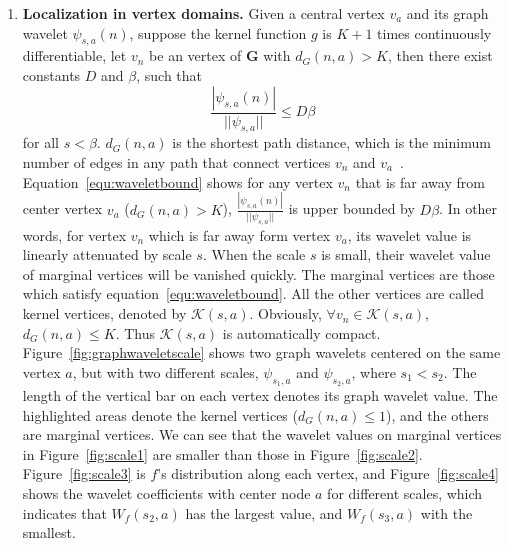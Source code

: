 \begin{enumerate}
\item \textbf{Localization in vertex domains.} Given a central vertex $v_a$ and its graph wavelet $\psi_{s,a}(n)$, suppose the kernel function $g$ is $K+1$ times continuously differentiable, let $v_n$ be an vertex of $\mathbf{G}$ with $d_G(n,a)>K$, then there exist constants $D$ and $\beta$, such that
\begin{equation}
\label{equ:waveletbound}
\frac{|\psi_{s,a}(n)|}{||\psi_{s,a}||}\leq D \beta
\end{equation} for all $s<\beta$.
$d_G(n,a)$ is the shortest path distance, which is the minimum number of edges in any path that connect vertices $v_n$ and $v_a$~\cite{hammond2011wavelets}. Equation~\ref{equ:waveletbound} shows for any vertex $v_n$ that is far away from center vertex $v_a$ ($d_G(n,a)>K$), $\frac{|\psi_{s,a}(n)|}{||\psi_{s,a}||}$ is upper bounded by $D\beta$. In other words, for vertex $v_n$ which is far away form vertex $v_a$, its wavelet value is linearly attenuated by scale $s$.  When the scale $s$ is small, their wavelet value of marginal vertices will be vanished quickly. The marginal vertices are those which satisfy equation~\ref{equ:waveletbound}. All the other vertices are called kernel vertices, denoted by $\mathcal{K}(s,a)$. Obviously, $\forall v_n \in \mathcal{K}(s,a)$,  $d_G(n,a)\le K$. Thus $\mathcal{K}(s,a)$ is automatically compact.
Figure~\ref{fig:graphwaveletscale} shows two graph wavelets centered on the same vertex $a$, but with two different scales, $\psi_{s_1,a}$ and $\psi_{s_2, a}$, where $s_1<s_2$. The length of the vertical bar on each vertex denotes its graph wavelet value. The highlighted areas denote the kernel vertices ($d_G(n,a)\le 1$), and the others are marginal vertices. We can see that the wavelet values on marginal vertices in Figure~\ref{fig:scale1} are smaller than those in Figure~\ref{fig:scale2}. Figure~\ref{fig:scale3} is $f$'s distribution along each vertex, and Figure~\ref{fig:scale4} shows the wavelet coefficients with center node $a$ for different scales, which indicates that
$W_f(s_2,a)$ has the largest value, and $W_f(s_3,a)$ with the smallest.
 \end{enumerate}




